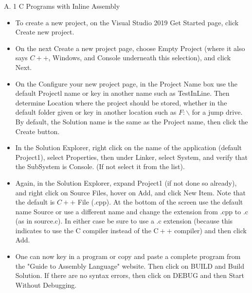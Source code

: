 \documentclass[10pt]{book}
\begin{document}
A. 1 C Programs with Inline Assembly
\begin{itemize}
  \item To create a new project, on the Visual Studio 2019 Get Started page, click Create new project.
  \item On the next Create a new project page, choose Empty Project (where it also says $C++$, Windows, and Console underneath this selection), and click Next.
  \item On the Configure your new project page, in the Project Name box use the default Projectl name or key in another name such as TestInLine. Then determine Location where the project should be stored, whether in the default folder given or key in another location such as $F: \backslash$ for a jump drive. By default, the Solution name is the same as the Project name, then click the Create button.
  \item In the Solution Explorer, right click on the name of the application (default Project1), select Properties, then under Linker, select System, and verify that the SubSystem is Console. (If not select it from the list).
  \item Again, in the Solution Explorer, expand Project1 (if not done so already), and right click on Source Files, hover on Add, and click New Item. Note that the default is $C++$ File (.cpp). At the bottom of the screen use the default name Source or use a different name and change the extension from .cpp to .c (as in source.c). In either case be sure to use a .c extension (because this indicates to use the C compiler instead of the $\mathrm{C}++$ compiler) and then click Add.
  \item One can now key in a program or copy and paste a complete program from the "Guide to Assembly Language" website. Then click on BUILD and Build Solution. If there are no syntax errors, then click on DEBUG and then Start Without Debugging.
\end{itemize}
\end{document}
